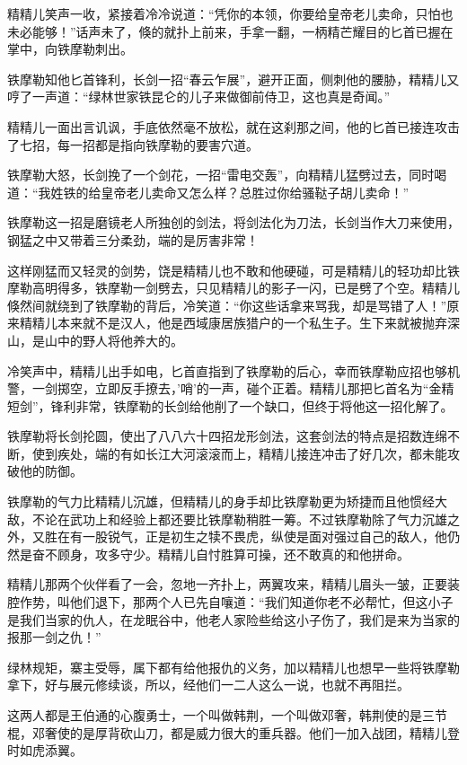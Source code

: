 \documentclass[12pt,oneside]{book}
\begin{document}
精精儿笑声一收，紧接着冷冷说道：``凭你的本领，你要给皇帝老儿卖命，只怕也未必能够！''话声未了，倏的就扑上前来，手拿一翻，一柄精芒耀目的匕首已握在掌中，向铁摩勒刺出。

铁摩勒知他匕首锋利，长剑一招``春云乍展''，避开正面，侧刺他的腰胁，精精儿又哼了一声道：``绿林世家铁昆仑的儿子来做御前侍卫，这也真是奇闻。''

精精儿一面出言讥讽，手底依然毫不放松，就在这刹那之间，他的匕首已接连攻击了七招，每一招都是指向铁摩勒的要害穴道。

铁摩勒大怒，长剑挽了一个剑花，一招``雷电交轰''，向精精儿猛劈过去，同时喝道：``我姓铁的给皇帝老儿卖命又怎么样？总胜过你给骚鞑子胡儿卖命！''

铁摩勒这一招是磨镜老人所独创的剑法，将剑法化为刀法，长剑当作大刀来使用，钢猛之中又带着三分柔劲，端的是厉害非常！

这样刚猛而又轻灵的剑势，饶是精精儿也不敢和他硬碰，可是精精儿的轻功却比铁摩勒高明得多，铁摩勒一剑劈去，只见精精儿的影子一闪，已是劈了个空。精精儿倏然间就绕到了铁摩勒的背后，冷笑道：``你这些话拿来骂我，却是骂错了人！''原来精精儿本来就不是汉人，他是西域康居族猎户的一个私生子。生下来就被抛弃深山，是山中的野人将他养大的。

冷笑声中，精精儿出手如电，匕首直指到了铁摩勒的后心，幸而铁摩勒应招也够机警，一剑掷空，立即反手撩去，'哨'的一声，碰个正着。精精儿那把匕首名为``金精短剑''，锋利非常，铁摩勒的长剑给他削了一个缺口，但终于将他这一招化解了。

铁摩勒将长剑抡圆，使出了八八六十四招龙形剑法，这套剑法的特点是招数连绵不断，使到疾处，端的有如长江大河滚滚而上，精精儿接连冲击了好几次，都未能攻破他的防御。

铁摩勒的气力比精精儿沉雄，但精精儿的身手却比铁摩勒更为矫捷而且他惯经大敌，不论在武功上和经验上都还要比铁摩勒稍胜一筹。不过铁摩勒除了气力沉雄之外，又胜在有一股锐气，正是初生之犊不畏虎，纵使是面对强过自己的敌人，他仍然是奋不顾身，攻多守少。精精儿自忖胜算可操，还不敢真的和他拼命。

精精儿那两个伙伴看了一会，忽地一齐扑上，两翼攻来，精精儿眉头一皱，正要装腔作势，叫他们退下，那两个人已先自嚷道：``我们知道你老不必帮忙，但这小子是我们当家的仇人，在龙眠谷中，他老人家险些给这小子伤了，我们是来为当家的报那一剑之仇！''

绿林规矩，寨主受辱，属下都有给他报仇的义务，加以精精儿也想早一些将铁摩勒拿下，好与展元修续谈，所以，经他们一二人这么一说，也就不再阻拦。

这两人都是王伯通的心腹勇士，一个叫做韩荆，一个叫做邓奢，韩荆使的是三节棍，邓奢使的是厚背砍山刀，都是威力很大的重兵器。他们一加入战团，精精儿登时如虎添翼。
\end{document}
